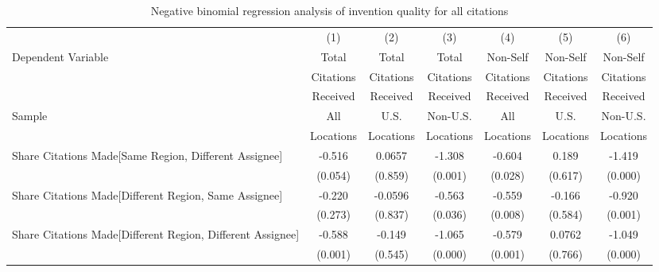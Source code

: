 \begin{table}[htbp]\centering
\caption{Negative binomial regression analysis of invention quality for all citations \label{a.e.o.t.n.model123192021}}
\small
\onehalfspacing
\begin{adjustbox}{angle=90}
\begin{tabular}{l*{6}{c}}
\hline\hline
                &\multicolumn{1}{c}{(1)}&\multicolumn{1}{c}{(2)}&\multicolumn{1}{c}{(3)}&\multicolumn{1}{c}{(4)}&\multicolumn{1}{c}{(5)}&\multicolumn{1}{c}{(6)}\\
 \multirow{3}{*}{Dependent Variable} &\multicolumn{1}{c}{Total}&\multicolumn{1}{c}{Total}&\multicolumn{1}{c}{Total}&\multicolumn{1}{c}{Non-Self}&\multicolumn{1}{c}{Non-Self}&\multicolumn{1}{c}{Non-Self}\\
                &\multicolumn{1}{c}{Citations}&\multicolumn{1}{c}{Citations}&\multicolumn{1}{c}{Citations}&\multicolumn{1}{c}{Citations}&\multicolumn{1}{c}{Citations}&\multicolumn{1}{c}{Citations}\\
                 &\multicolumn{1}{c}{Received}&\multicolumn{1}{c}{Received}&\multicolumn{1}{c}{Received}&\multicolumn{1}{c}{Received}&\multicolumn{1}{c}{Received}&\multicolumn{1}{c}{Received}\\
                 \hline
 \multirow{2}{*}{Sample}&\multicolumn{1}{c}{All}&\multicolumn{1}{c}{U.S.}&\multicolumn{1}{c}{Non-U.S.}&\multicolumn{1}{c}{All}&\multicolumn{1}{c}{U.S.}&\multicolumn{1}{c}{Non-U.S.}\\       
  &\multicolumn{1}{c}{Locations}&\multicolumn{1}{c}{Locations}&\multicolumn{1}{c}{Locations}&\multicolumn{1}{c}{Locations}&\multicolumn{1}{c}{Locations}&\multicolumn{1}{c}{Locations}\\           
\hline
Share Citations Made[Same Region, Different Assignee]&   -0.516&   0.0657&   -1.308&   -0.604&    0.189&   -1.419\\
                &  (0.054)&  (0.859)&  (0.001)&  (0.028)&  (0.617)&  (0.000)\\
Share Citations Made[Different Region, Same Assignee]&   -0.220&  -0.0596&   -0.563&   -0.559&   -0.166&   -0.920\\
                &  (0.273)&  (0.837)&  (0.036)&  (0.008)&  (0.584)&  (0.001)\\
Share Citations Made[Different Region, Different Assignee]&   -0.588&   -0.149&   -1.065&   -0.579&   0.0762&   -1.049\\
                &  (0.001)&  (0.545)&  (0.000)&  (0.001)&  (0.766)&  (0.000)\\

\end{tabular}
\end{adjustbox}
\end{table}

